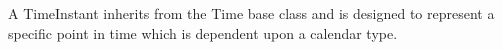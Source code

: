 
A TimeInstant inherits from the Time base class and is designed to represent
a specific point in time which is dependent upon a calendar type.
